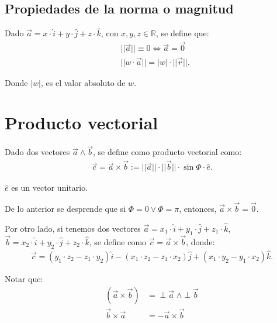 \documentclass[12pt]{article}
\begin{document}
\subsection{Propiedades de la norma o magnitud}
Dado $\vec{a} = x \cdot \hat{i} + y \cdot \hat{j}  + z \cdot \hat{k}$, con $x,y,z \in \mathbb{R}$, se define que:
	\begin{align*}
		& ||\vec{a}|| \equiv 0 \iff \vec{a}=\vec{0} \\
		& || w \cdot \vec{a} || = |w| \cdot ||  \vec{r} ||.
	\end{align*}

Donde $|w|$, es el valor absoluto de $w$.
\section{Producto vectorial}
Dado dos vectores $\vec{a} \land \vec{b}$, se define como producto vectorial como:
	\begin{align*}
		\vec{c} = \vec{a} \times \vec{b} := || \vec{a} || \cdot ||  \vec{b} || \cdot   \sin \Phi \cdot \hat{e}.
	\end{align*}

  $\hat{e}$ es un vector unitario.

De lo anterior se desprende que si $\Phi = 0 \lor \Phi = \pi$, entonces, $\vec{a} \times \vec{b} = \vec{0}$.

Por otro lado, si tenemos dos vectores $\vec{a} =x_1 \cdot \hat{i} +y_1 \cdot \hat{j} + z_1 \cdot \hat{k}$, $\vec{b} = x_2 \cdot \hat{i} + y_2 \cdot \hat{j} + z_2 \cdot \hat{k}$, se define como $\vec{c} = \vec{a} \times \vec{b}$, donde:
	\begin{align*}
		\vec{c}= (y_1 \cdot z_2 - z_1 \cdot y_2) \hat{i} - (x_1 \cdot z_2 - z_1 \cdot x_2) \hat{j} +(x_1 \cdot y_2 - y_1  \cdot x_2)\hat{k}.
	\end{align*}
	
Notar que: 
	\begin{align*}
		(\vec{a} \times \vec{b}) & = \perp \vec{a} \; \land \perp \vec{b} \\ 
		\vec{b} \times \vec{a} & = - \vec{a} \times \vec{b}
	\end{align*}
\end{document}
